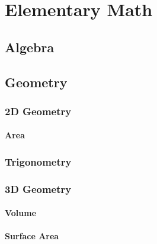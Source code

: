 \documentclass[../mathematics_cheat_sheet.tex]{subfiles}
\begin{document}
\part{Elementary Math}





\chapter{Algebra}
\chapter{Geometry}
\section{2D Geometry}
\subsection{Area}
\section{Trigonometry}
\section{3D Geometry}
\subsection{Volume}
\subsection{Surface Area}
\end{document}
